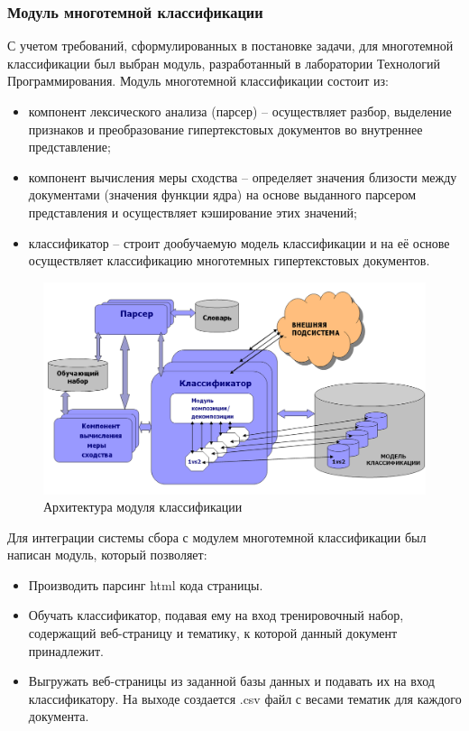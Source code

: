 \documentclass[russian, utf8, emptystyle]{eskdtext}
\begin{document}
\subsubsection{Модуль многотемной классификации}
С учетом требований, сформулированных в постановке задачи, для многотемной классификации был выбран модуль, разработанный в лаборатории Технологий Программирования.
Модуль многотемной классификации состоит из:
\begin{itemize}
	\item компонент лексического анализа (парсер) – осуществляет разбор, выделение признаков и преобразование гипертекстовых документов во внутреннее представление;
	\item компонент вычисления меры сходства – определяет значения близости между документами (значения функции ядра) на основе выданного парсером представления и осуществляет кэширование этих значений; 
	\item классификатор – строит дообучаемую модель классификации и на её основе осуществляет классификацию многотемных гипертекстовых документов.
\end{itemize}
 \begin{figure}[h]
 	\begin{center}
 		\includegraphics[width=14cm]{pic/module2.png}
 		\caption{Архитектура модуля классификации}
 		\label{fig:low_sigma}
 	\end{center}
 \end{figure}
 
Для интеграции системы сбора с модулем многотемной классификации был написан модуль, который позволяет:
\begin{itemize}
\item Производить парсинг html кода страницы.
\item Обучать классификатор, подавая ему на вход тренировочный набор, содержащий веб-страницу и тематику, к которой данный документ принадлежит.
\item Выгружать веб-страницы из заданной базы данных и подавать их на вход классификатору. На выходе создается .csv файл с весами тематик для каждого документа.
\end{itemize}
\end{document}
